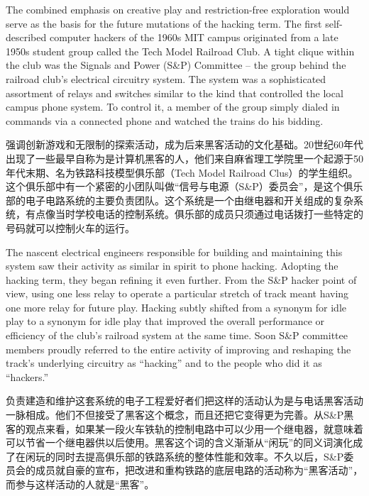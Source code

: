 \ifdefined\eng
The combined emphasis on creative play and restriction-free exploration would serve as the basis for the future mutations of the hacking term. The first self-described computer hackers of the 1960s MIT campus originated from a late 1950s student group called the Tech Model Railroad Club. A tight clique within the club was the Signals and Power (S\&P) Committee -- the group behind the railroad club's electrical circuitry system. The system was a sophisticated assortment of relays and switches similar to the kind that controlled the local campus phone system. To control it, a member of the group simply dialed in commands via a connected phone and watched the trains do his bidding.
\fi

\ifdefined\chs
强调创新游戏和无限制的探索活动，成为后来黑客活动的文化基础。20世纪60年代出现了一些最早自称为是计算机黑客的人，他们来自麻省理工学院里一个起源于50年代末期、名为铁路科技模型俱乐部（Tech Model Railroad Clus）的学生组织。这个俱乐部中有一个紧密的小团队叫做“信号与电源（S\&P）委员会”，是这个俱乐部的电子电路系统的主要负责团队。这个系统是一个由继电器和开关组成的复杂系统，有点像当时学校电话的控制系统。俱乐部的成员只须通过电话拨打一些特定的号码就可以控制火车的运行。
\fi

\ifdefined\eng
The nascent electrical engineers responsible for building and maintaining this system saw their activity as similar in spirit to phone hacking. Adopting the hacking term, they began refining it even further. From the S\&P hacker point of view, using one less relay to operate a particular stretch of track meant having one more relay for future play. Hacking subtly shifted from a synonym for idle play to a synonym for idle play that improved the overall performance or efficiency of the club's railroad system at the same time. Soon S\&P committee members proudly referred to the entire activity of improving and reshaping the track's underlying circuitry as ``hacking'' and to the people who did it as ``hackers.''
\fi

\ifdefined\chs
负责建造和维护这套系统的电子工程爱好者们把这样的活动认为是与电话黑客活动一脉相成。他们不但接受了黑客这个概念，而且还把它变得更为完善。从S\&P黑客的观点来看，如果某一段火车铁轨的控制电路中可以少用一个继电器，就意味着可以节省一个继电器供以后使用。黑客这个词的含义渐渐从“闲玩”的同义词演化成了在闲玩的同时去提高俱乐部的铁路系统的整体性能和效率。不久以后，S\&P委员会的成员就自豪的宣布，把改进和重构铁路的底层电路的活动称为“黑客活动”，而参与这样活动的人就是“黑客”。
\fi


